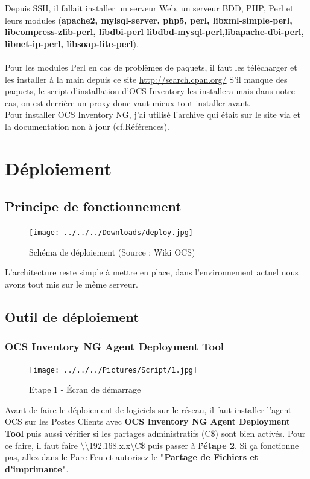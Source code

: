 \documentclass[11pt,a4paper,oneside]{article}
\begin{document}
Depuis SSH, il fallait installer un serveur Web, un serveur BDD, PHP, Perl et leurs modules (\textbf{apache2, mylsql-server, php5, perl, libxml-simple-perl, libcompress-zlib-perl, libdbi-perl libdbd-mysql-perl,libapache-dbi-perl, libnet-ip-perl, libsoap-lite-perl}).\\ \\
Pour les modules Perl en cas de problèmes de paquets, il faut les télécharger et les installer à la main depuis ce site \url{http://search.cpan.org/} 
S'il manque des paquets, le script d'installation d'OCS Inventory les installera mais dans notre cas, on est derrière un proxy donc vaut mieux tout installer avant. \\

Pour installer OCS Inventory NG, j'ai utilisé l'archive qui était sur le site via  et la documentation non à jour (cf.Références).
\newpage
\section{Déploiement}
\subsection{Principe de fonctionnement}
\begin{figure}[hbtp]
\texttt{[image: ../../../Downloads/deploy.jpg]}
\caption{Schéma de déploiement (Source : Wiki OCS)}
\end{figure}
L'architecture reste simple à mettre en place, dans l'environnement actuel nous avons tout mis sur le même serveur.
\subsection{Outil de déploiement}
\subsubsection{OCS Inventory NG Agent Deployment Tool}
\begin{figure}[hbtp]
\centering
\texttt{[image: ../../../Pictures/Script/1.jpg]}
\caption{Etape 1 - Écran de démarrage}
\end{figure}
Avant de faire le déploiement de logiciels sur le réseau, il faut installer l'agent OCS sur les Postes Clients avec \textbf{OCS Inventory NG Agent Deployment Tool} puis aussi vérifier si les partages administratifs (C\$) sont bien activés. Pour ce faire, il faut faire \textbackslash\textbackslash 192.168.x.x\textbackslash C\$
 puis passer à \textbf{l'étape 2}. Si ça fonctionne pas, allez dans le Pare-Feu et autorisez le \textbf{"Partage de Fichiers et d'imprimante"}.
\newpage
\end{document}
